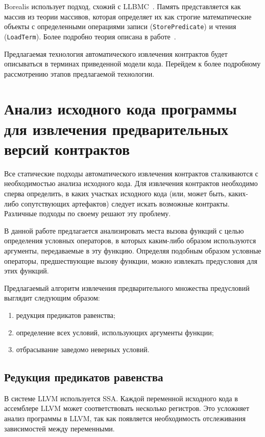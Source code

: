 Borealis использует подход, схожий с LLBMC~\cite{llbmc}. Память представляется как массив из теории массивов, которая определяет их как строгие математические объекты с определенными операциями записи (\texttt{StorePredicate}) и чтения (\texttt{LoadTerm}). Более подробно теория описана в работе~\cite{theoryOfArrays}.

Предлагаемая технология автоматического извлечения контрактов будет описываться в терминах приведенной модели кода. Перейдем к более подробному рассмотрению этапов предлагаемой технологии.

\section{Анализ исходного кода программы для извлечения предварительных версий контрактов}
\label{section:analysis}
Все статические подходы автоматического извлечения контрактов сталкиваются с необходимостью анализа исходного кода. Для извлечения контрактов необходимо сперва определить, в каких участках исходного кода (или, может быть, каких-либо сопутствующих артефактов) следует искать возможные контракты. Различные подходы по своему решают эту проблему.

В данной работе предлагается анализировать места вызова функций с целью определения условных операторов, в которых каким-либо образом используются аргументы, передаваемые в эту функцию. Определяя подобным образом условные операторы, предшествующие вызову функции, можно извлекать предусловия для этих функций.

Предлагаемый алгоритм извлечения предварительного множества предусловий выглядит следующим образом:
\begin{enumerate}
\item редукция предикатов равенства;
\item определение всех условий, использующих аргументы функции;
\item отбрасывание заведомо неверных условий.
\end{enumerate}

\subsection{Редукция предикатов равенства}
\label{subsection:reduction}
В системе LLVM используется SSA. Каждой переменной исходного кода в ассемблере LLVM может соответствовать несколько регистров. Это усложняет анализ программы в LLVM, так как появляется необходимость отслеживания зависимостей между переменными.

